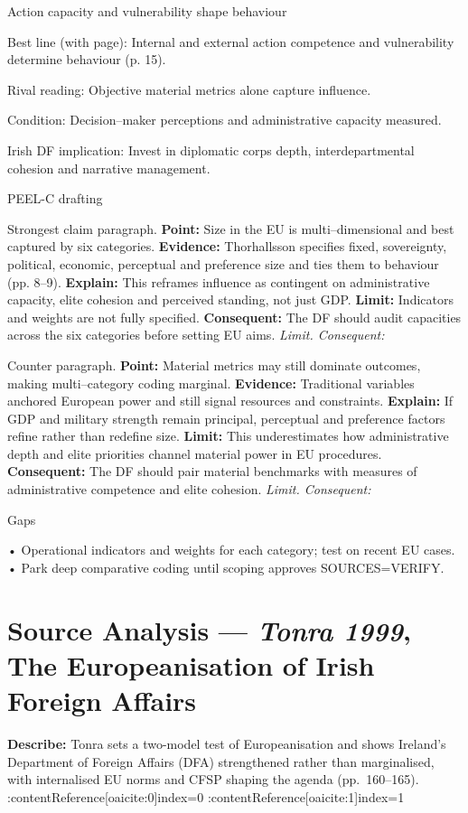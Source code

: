 Action capacity and vulnerability shape behaviour

Best line (with page): Internal and external action competence and vulnerability determine behaviour (p. 15).

Rival reading: Objective material metrics alone capture influence.

Condition: Decision–maker perceptions and administrative capacity measured.

Irish DF implication: Invest in diplomatic corps depth, interdepartmental cohesion and narrative management.

PEEL-C drafting

Strongest claim paragraph.
\textbf{Point:} Size in the EU is multi–dimensional and best captured by six categories.
\textbf{Evidence:} Thorhallsson specifies fixed, sovereignty, political, economic, perceptual and preference size and ties them to behaviour (pp. 8–9).
\textbf{Explain:} This reframes influence as contingent on administrative capacity, elite cohesion and perceived standing, not just GDP.
\textbf{Limit:} Indicators and weights are not fully specified.
\textbf{Consequent:} The DF should audit capacities across the six categories before setting EU aims. \textit{Limit. Consequent:}

Counter paragraph.
\textbf{Point:} Material metrics may still dominate outcomes, making multi–category coding marginal.
\textbf{Evidence:} Traditional variables anchored European power and still signal resources and constraints.
\textbf{Explain:} If GDP and military strength remain principal, perceptual and preference factors refine rather than redefine size.
\textbf{Limit:} This underestimates how administrative depth and elite priorities channel material power in EU procedures.
\textbf{Consequent:} The DF should pair material benchmarks with measures of administrative competence and elite cohesion. \textit{Limit. Consequent:}

Gaps

• Operational indicators and weights for each category; test on recent EU cases.
• Park deep comparative coding until scoping approves SOURCES=VERIFY.

\parencite{TONRA_1999
}

\section*{Source Analysis — \textit{Tonra 1999}, The Europeanisation of Irish Foreign Affairs}
\textbf{Describe:} Tonra sets a two-model test of Europeanisation and shows Ireland’s Department of Foreign Affairs (DFA) strengthened rather than marginalised, with internalised EU norms and CFSP shaping the agenda (pp.~160–165). :contentReference[oaicite:0]{index=0} :contentReference[oaicite:1]{index=1}

